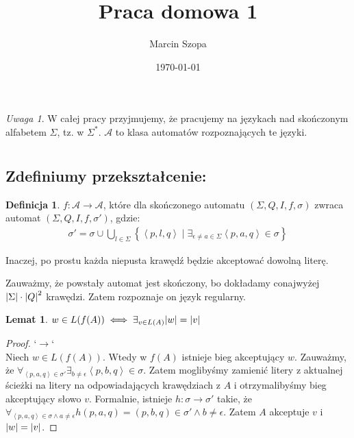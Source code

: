 \documentclass{article}
\title{Praca domowa 1}
\author{Marcin Szopa}
\date{\today}
\newtheorem{lemma}[theorem]{Lemat}
\theoremstyle{definition}
\newtheorem{definition}{Definicja}[section]
\theoremstyle{remark}
\newtheorem*{remark}{Uwaga}
\begin{document}
\maketitle

\begin{remark}
W całej pracy przyjmujemy, że pracujemy na językach nad skończonym alfabetem \(\Sigma\), tz. w \( \Sigma^* \). \(\mathcal{A}\) to klasa automatów rozpoznających te języki.
\end{remark}

\section{}

\subsection{Zdefiniumy przekształcenie:}

\begin{definition}
\(f: \mathcal{A} \to \mathcal{A}\), które dla skończonego automatu \(\left(\Sigma, Q, I, f, \sigma\right)\) zwraca automat \(\left(\Sigma, Q, I, f, \sigma'\right)\), gdzie:
\begin{align*}
\sigma' = \sigma \cup \bigcup_{l \in \Sigma} \left\{ \left< p, l, q \right> \mid \exists_{\epsilon \neq a \in \Sigma}{\left< p, a, q \right> \in \sigma} \right\}
\end{align*}
\end{definition}
Inaczej, po prostu każda niepusta krawędź będzie akceptować dowolną literę.

Zauważmy, że powstały automat jest skończony, bo dokładamy conajwyżej \(\abs{\Sigma} \cdot \abs{Q}^2\) krawędzi. Zatem rozpoznaje on język regularny.

\begin{lemma}
    \(w \in L(f(A)) \iff \exists_{v \in L(A)} \abs{w}=\abs{v}\)
\end{lemma}
\begin{proof}
`\(\rightarrow\)` \\
Niech \(w \in L(f(A))\). Wtedy w \(f(A)\) istnieje bieg akceptujący \(w\).
Zauważmy, że \(\forall_{\left< p, a, q \right> \in \sigma'} \exists_{b \neq \epsilon} \left< p, b, q \right> \in \sigma\).
Zatem moglibyśmy zamienić litery z aktualnej ścieżki na litery na odpowiadających krawędziach z \(A\)
i otrzymalibyśmy bieg akceptujący słowo \(v\).
Formalnie, istnieje \(h: \sigma \to \sigma'\) takie,
że \( \forall_{\left< p, a, q \right> \in \sigma \land a \neq \epsilon} {h(p, a, q) = (p, b, q) \in \sigma' \land b \neq \epsilon }\).
Zatem \(A\) akceptuje \(v\) i \(\abs{w} = \abs{v}\).
\end{proof}
\end{document}
